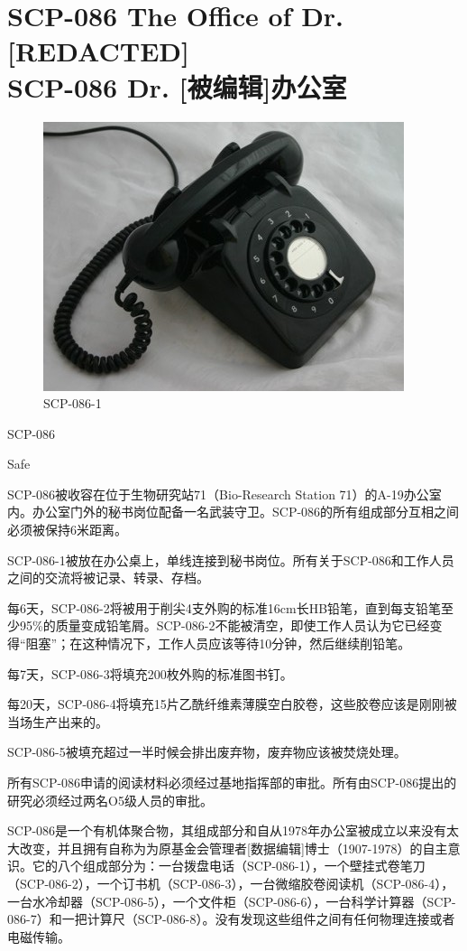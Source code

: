 \chapter[SCP-086 Dr. {[}被编辑{]}办公室]{
    SCP-086 The Office of Dr. [REDACTED]\\
    SCP-086 Dr. [被编辑]办公室
}

\label{chap:SCP-086}

\begin{figure}[H]
    \centering
    \includegraphics[width=0.5\linewidth]{images/SCP-086.jpg}
    \caption*{SCP-086-1}
\end{figure}

SCP-086

  Safe

SCP-086被收容在位于生物研究站71（Bio-Research Station 71）的A-19办公室内。办公室门外的秘书岗位配备一名武装守卫。SCP-086的所有组成部分互相之间必须被保持6米距离。

SCP-086-1被放在办公桌上，单线连接到秘书岗位。所有关于SCP-086和工作人员之间的交流将被记录、转录、存档。

每6天，SCP-086-2将被用于削尖4支外购的标准16cm长HB铅笔，直到每支铅笔至少95\%的质量变成铅笔屑。SCP-086-2不能被清空，即使工作人员认为它已经变得“阻塞”；在这种情况下，工作人员应该等待10分钟，然后继续削铅笔。

每7天，SCP-086-3将填充200枚外购的标准图书钉。

每20天，SCP-086-4将填充15片乙酰纤维素薄膜空白胶卷，这些胶卷应该是刚刚被当场生产出来的。

SCP-086-5被填充超过一半时候会排出废弃物，废弃物应该被焚烧处理。

所有SCP-086申请的阅读材料必须经过基地指挥部的审批。所有由SCP-086提出的研究必须经过两名O5级人员的审批。

SCP-086是一个有机体聚合物，其组成部分和自从1978年办公室被成立以来没有太大改变，并且拥有自称为为原基金会管理者{[}数据编辑]博士（1907-1978）的自主意识。它的八个组成部分为：一台拨盘电话（SCP-086-1），一个壁挂式卷笔刀（SCP-086-2），一个订书机（SCP-086-3），一台微缩胶卷阅读机（SCP-086-4），一台水冷却器（SCP-086-5），一个文件柜（SCP-086-6），一台科学计算器（SCP-086-7）和一把计算尺（SCP-086-8）。没有发现这些组件之间有任何物理连接或者电磁传输。

